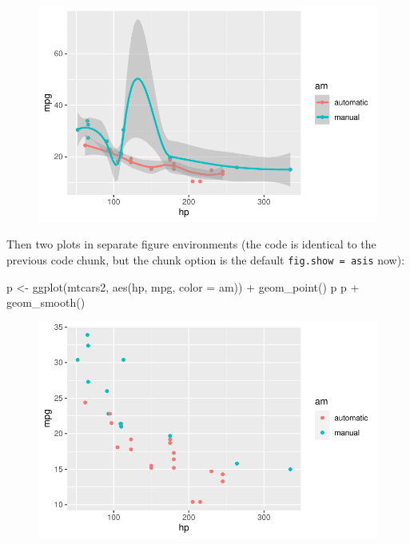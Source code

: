 \documentclass[
  letterpaper,
  DIV=11,
  numbers=noendperiod,
  oneside]{scrartcl}
\newenvironment{Shaded}{\begin{snugshade}}{\end{snugshade}}
\newcommand{\AttributeTok}[1]{\textcolor[rgb]{0.40,0.45,0.13}{#1}}
\newcommand{\FunctionTok}[1]{\textcolor[rgb]{0.28,0.35,0.67}{#1}}
\newcommand{\NormalTok}[1]{\textcolor[rgb]{0.00,0.23,0.31}{#1}}
\newcommand{\OtherTok}[1]{\textcolor[rgb]{0.00,0.23,0.31}{#1}}
\newcommand{\SpecialCharTok}[1]{\textcolor[rgb]{0.37,0.37,0.37}{#1}}
\begin{document}
\begin{figure}[H]


{\centering \includegraphics{cv_files/figure-pdf/fig-two-together-2.pdf}

}

\end{figure}

Then two plots in separate figure environments (the code is identical to
the previous code chunk, but the chunk option is the default
\texttt{fig.show\ =\ \textquotesingle{}asis\textquotesingle{}} now):

\begin{Shaded}
\begin{Highlighting}[]
\NormalTok{p }\OtherTok{\textless{}{-}} \FunctionTok{ggplot}\NormalTok{(mtcars2, }\FunctionTok{aes}\NormalTok{(hp, mpg, }\AttributeTok{color =}\NormalTok{ am)) }\SpecialCharTok{+}
  \FunctionTok{geom\_point}\NormalTok{()}
\NormalTok{p}
\NormalTok{p }\SpecialCharTok{+} \FunctionTok{geom\_smooth}\NormalTok{()}
\end{Highlighting}
\end{Shaded}

\begin{figure}[H]


{\centering \includegraphics{cv_files/figure-pdf/fig-two-separate-1.pdf}

}

\end{figure}
\end{document}
